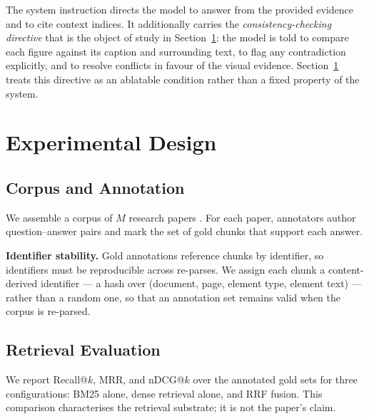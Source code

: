 \documentclass[conference]{IEEEtran}
\newif\ifdraftmode
\newcommand{\TODO}[1]{\ifdraftmode\textcolor{red}{\textbf{[TODO: #1]}}\fi}
\newcommand{\NUM}[1]{\ifdraftmode\textcolor{red}{\textbf{[#1]}}\else#1\fi}
\begin{document}
The system instruction directs the model to answer from the provided evidence
and to cite context indices. It additionally carries the
\emph{consistency-checking directive} that is the object of study in
Section~\ref{sec:protocol}: the model is told to compare each figure against
its caption and surrounding text, to flag any contradiction explicitly, and to
resolve conflicts in favour of the visual evidence. Section~\ref{sec:protocol}
treats this directive as an ablatable condition rather than a fixed property of
the system.

\section{Experimental Design}
\label{sec:protocol}

\subsection{Corpus and Annotation}
We assemble a corpus of \NUM{$M$} research papers
\TODO{state the source venue/arXiv categories and the sampling procedure; a
convenience sample must be described as one}.
For each paper, annotators author question--answer pairs and mark the set of
gold chunks that support each answer.

\textbf{Identifier stability.} Gold annotations reference chunks by
identifier, so identifiers must be reproducible across re-parses. We assign
each chunk a content-derived identifier --- a hash over
(document, page, element type, element text) --- rather than a random one, so
that an annotation set remains valid when the corpus is re-parsed.
\TODO{This is a requirement on the implementation, not a description of it.
The current parser assigns \texttt{uuid4()} per chunk, which invalidates gold
labels on every re-parse. Change the parser before annotating anything, or the
annotation effort is wasted.}

\subsection{Retrieval Evaluation}
We report Recall@$k$, MRR, and nDCG@$k$ over the annotated gold sets for three
configurations: BM25 alone, dense retrieval alone, and RRF fusion. This
comparison characterises the retrieval substrate; it is not the paper's claim.

\TODO{The evaluation harness currently substitutes the fusion system's own
top-ranked output for the gold labels when the annotated identifiers do not
resolve. Under that substitution the fusion condition scores perfectly by
construction and the baselines are scored against fusion's output rather than
against ground truth. No number produced by the harness in its present state
may enter this paper. Remove the substitution and make unresolvable gold
identifiers a hard error before running anything.}
\end{document}
